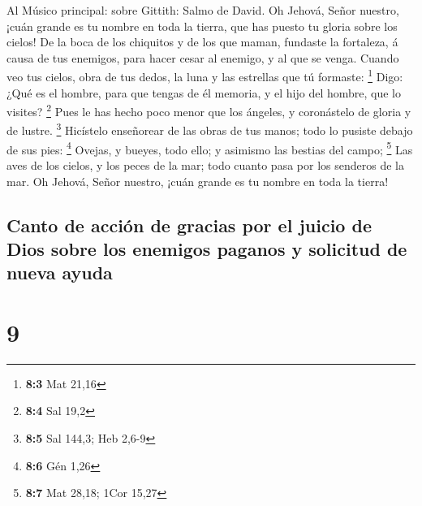  Al Músico principal: sobre Gittith: Salmo de David. Oh
Jehová, Señor nuestro, ¡cuán grande es tu nombre en toda la tierra, que
has puesto tu gloria sobre los cielos!  De la boca de los
chiquitos y de los que maman, fundaste la fortaleza, á causa de tus
enemigos, para hacer cesar al enemigo, y al que se venga. 
Cuando veo tus cielos, obra de tus dedos, la luna y las estrellas que tú
formaste: \footnote{\textbf{8:3} Mat 21,16}  Digo: ¿Qué es
el hombre, para que tengas de él memoria, y el hijo del hombre, que lo
visites? \footnote{\textbf{8:4} Sal 19,2}  Pues le has hecho
poco menor que los ángeles, y coronástelo de gloria y de lustre.
\footnote{\textbf{8:5} Sal 144,3; Heb 2,6-9}  Hicístelo
enseñorear de las obras de tus manos; todo lo pusiste debajo de sus
pies: \footnote{\textbf{8:6} Gén 1,26}  Ovejas, y bueyes,
todo ello; y asimismo las bestias del campo; \footnote{\textbf{8:7} Mat
  28,18; 1Cor 15,27}  Las aves de los cielos, y los peces de
la mar; todo cuanto pasa por los senderos de la mar.  Oh
Jehová, Señor nuestro, ¡cuán grande es tu nombre en toda la tierra!

\hypertarget{canto-de-acciuxf3n-de-gracias-por-el-juicio-de-dios-sobre-los-enemigos-paganos-y-solicitud-de-nueva-ayuda}{%
\subsection{Canto de acción de gracias por el juicio de Dios sobre los
enemigos paganos y solicitud de nueva
ayuda}\label{canto-de-acciuxf3n-de-gracias-por-el-juicio-de-dios-sobre-los-enemigos-paganos-y-solicitud-de-nueva-ayuda}}

\hypertarget{section-8}{%
\section{9}\label{section-8}}

